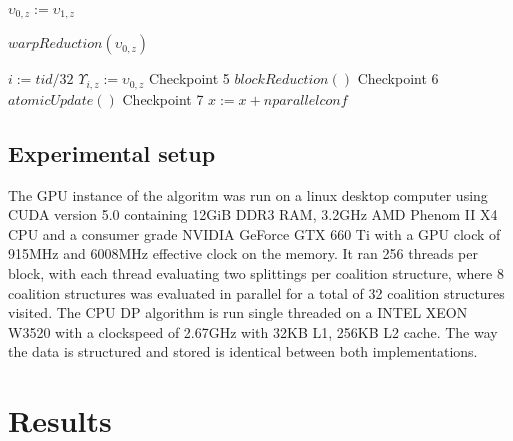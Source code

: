 \documentclass{llncs}
\begin{document}
\begin{algorithm}
\begin{algorithmic}[1]
      \STATE $\upsilon_{0,z} := \upsilon_{1,z}$
    \ENDIF
    
    \STATE $warpReduction(\upsilon_{0,z})$

      \STATE $i := tid / 32$
      \STATE $\Upsilon_{i,z} := \upsilon_{0,z}$
    \ENDIF
   \hfill Checkpoint 5
  \ENDFOR
  \STATE $blockReduction()$
  \hfill Checkpoint 6
  \STATE $atomicUpdate()$\label{lst:line:reductionend}
  \ENDIF
  \hfill Checkpoint 7
  \STATE $x := x + nparallelconf$
\ENDFOR
\end{algorithmic}
\end{algorithm}

\subsection{Experimental setup}

The GPU instance of the algoritm was run on a linux desktop computer using CUDA version 5.0 containing 12GiB DDR3 RAM, 
3.2GHz AMD Phenom II X4 CPU and a consumer grade NVIDIA GeForce GTX 660 Ti with a GPU clock of 915MHz and 6008MHz effective clock on the memory.
It ran 256 threads per block, with each thread evaluating two splittings per coalition structure, 
where 8 coalition structures was evaluated in parallel for a total of 32 coalition structures visited.
The CPU DP algorithm is run single threaded on a INTEL XEON W3520 with a clockspeed of 2.67GHz with 32KB L1, 256KB L2 cache. 
The way the data is structured and stored is identical between both implementations.
\section{Results}
\end{document}
